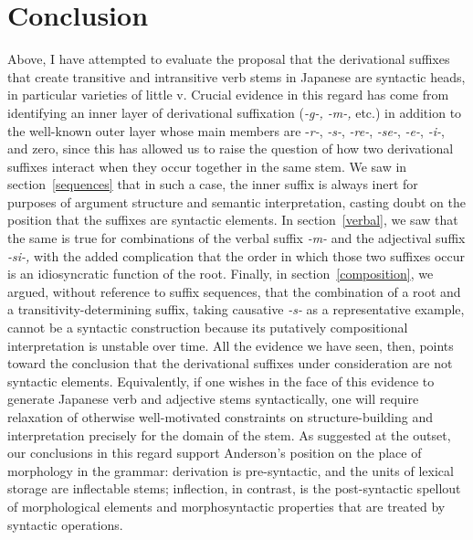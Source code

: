 \documentclass[output=paper,
modfonts
]{LSP/langsci}
\begin{document}
\section{Conclusion}\label{conclusion}

Above, I have attempted to evaluate the proposal that the derivational
suffixes that create transitive and intransitive verb stems in Japanese
are syntactic heads, in particular varieties of little v. Crucial
evidence in this regard has come from identifying an inner layer of
derivational suffixation (\textit{-g-, -m-,} etc.) in addition to the
well-known outer layer whose main members are -\textit{r-}, \textit{-s-},
\textit{-re-}, \textit{-se-}, \textit{-e-}, \textit{-i-}, and zero, since this
has allowed us to raise the question of how two derivational suffixes
interact when they occur together in the same stem. We saw in section~\ref{sequences}
that in such a case, the inner suffix is always inert for purposes of
argument structure and semantic interpretation, casting doubt on the
position that the suffixes are syntactic elements. In section~\ref{verbal}, we saw
that the same is true for combinations of the verbal suffix \textit{-m-}
and the adjectival suffix \textit{-si-,} with the added complication that
the order in which those two suffixes occur is an idiosyncratic function
of the root. Finally, in section~\ref{composition}, we argued, without reference to
suffix sequences, that the combination of a root and a
transitivity-determining suffix, taking causative \textit{-s-} as a
representative example, cannot be a syntactic construction because its
putatively compositional interpretation is unstable over time. All the
evidence we have seen, then, points toward the conclusion that the
derivational suffixes under consideration are not syntactic elements.
Equivalently, if one wishes in the face of this evidence to generate
Japanese verb and adjective stems syntactically, one will require
relaxation of otherwise well-motivated constraints on structure-building
and interpretation precisely for the domain of the stem. As suggested at
the outset, our conclusions in this regard support Anderson's \citeyearpar[594]{anderson1982a} position on the place of morphology in the grammar: derivation is pre-syntactic, and the units of lexical storage are inflectable stems;
inflection, in contrast, is the post-syntactic spellout of morphological
elements and morphosyntactic properties that are treated by syntactic
operations.
\end{document}
